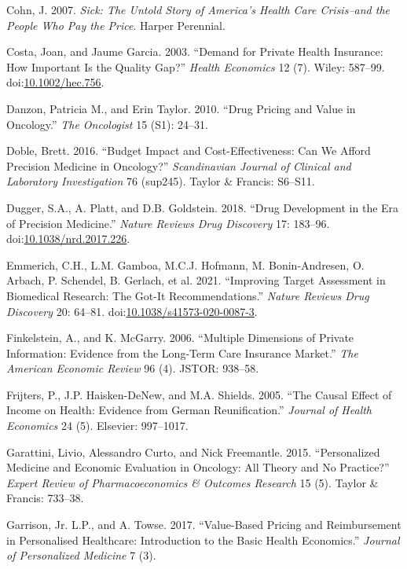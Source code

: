 \documentclass[a4paper,12pt]{article}
\begin{document}
\hypertarget{citeproc_bib_item_7}{Cohn, J. 2007. \textit{Sick: The Untold Story of America’s Health Care Crisis–and the People Who Pay the Price}. Harper Perennial.}

\hypertarget{citeproc_bib_item_8}{Costa, Joan, and Jaume Garcia. 2003. “Demand for Private Health Insurance: How Important Is the Quality Gap?” \textit{Health Economics} 12 (7). Wiley: 587–99. doi:\href{https://doi.org/10.1002/hec.756}{10.1002/hec.756}.}

\hypertarget{citeproc_bib_item_9}{Danzon, Patricia M., and Erin Taylor. 2010. “Drug Pricing and Value in Oncology.” \textit{The Oncologist} 15 (S1): 24–31.}

\hypertarget{citeproc_bib_item_10}{Doble, Brett. 2016. “Budget Impact and Cost-Effectiveness: Can We Afford Precision Medicine in Oncology?” \textit{Scandinavian Journal of Clinical and Laboratory Investigation} 76 (sup245). Taylor \& Francis: S6–S11.}

\hypertarget{citeproc_bib_item_11}{Dugger, S.A., A. Platt, and D.B. Goldstein. 2018. “Drug Development in the Era of Precision Medicine.” \textit{Nature Reviews Drug Discovery} 17: 183–96. doi:\href{https://doi.org/10.1038/nrd.2017.226}{10.1038/nrd.2017.226}.}

\hypertarget{citeproc_bib_item_12}{Emmerich, C.H., L.M. Gamboa, M.C.J. Hofmann, M. Bonin-Andresen, O. Arbach, P. Schendel, B. Gerlach, et al. 2021. “Improving Target Assessment in Biomedical Research: The Got-It Recommendations.” \textit{Nature Reviews Drug Discovery} 20: 64–81. doi:\href{https://doi.org/10.1038/s41573-020-0087-3}{10.1038/s41573-020-0087-3}.}

\hypertarget{citeproc_bib_item_13}{Finkelstein, A., and K. McGarry. 2006. “Multiple Dimensions of Private Information: Evidence from the Long-Term Care Insurance Market.” \textit{The American Economic Review} 96 (4). JSTOR: 938–58.}

\hypertarget{citeproc_bib_item_14}{Frijters, P., J.P. Haisken-DeNew, and M.A. Shields. 2005. “The Causal Effect of Income on Health: Evidence from German Reunification.” \textit{Journal of Health Economics} 24 (5). Elsevier: 997–1017.}

\hypertarget{citeproc_bib_item_15}{Garattini, Livio, Alessandro Curto, and Nick Freemantle. 2015. “Personalized Medicine and Economic Evaluation in Oncology: All Theory and No Practice?” \textit{Expert Review of Pharmacoeconomics \& Outcomes Research} 15 (5). Taylor \& Francis: 733–38.}

\hypertarget{citeproc_bib_item_16}{Garrison, Jr. L.P., and A. Towse. 2017. “Value-Based Pricing and Reimbursement in Personalised Healthcare: Introduction to the Basic Health Economics.” \textit{Journal of Personalized Medicine} 7 (3).}
\end{document}

